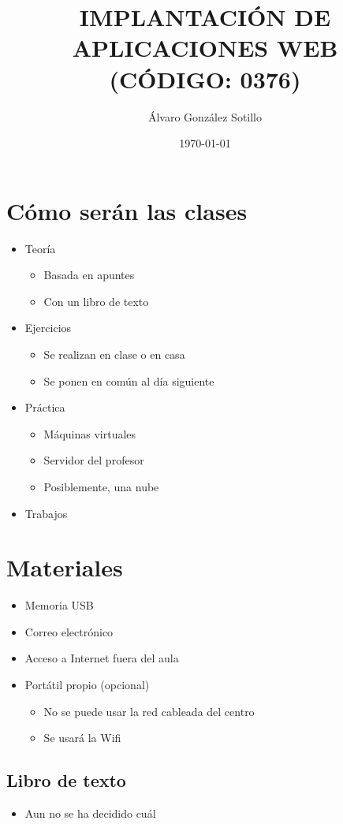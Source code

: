 \documentclass[a4paper]{article}
\author{Álvaro González Sotillo}
\date{\today}
\title{IMPLANTACIÓN DE APLICACIONES WEB\\\medskip
\large  (CÓDIGO: 0376)}
\begin{document}
\maketitle
\setcounter{tocdepth}{1}
\tableofcontents

\captionsetup{font=scriptsize}

\section{Cómo serán las clases}
\label{sec:org0000000}
\begin{itemize}
\item Teoría
\begin{itemize}
\item Basada en apuntes
\item Con un libro de texto
\end{itemize}
\item Ejercicios
\begin{itemize}
\item Se realizan en clase o en casa
\item Se ponen en común al día siguiente
\end{itemize}
\item Práctica
\begin{itemize}
\item Máquinas virtuales
\item Servidor del profesor
\item Posiblemente, una nube
\end{itemize}
\item Trabajos
\end{itemize}

\section{Materiales}
\label{sec:org0000006}
\begin{itemize}
\item Memoria USB
\item Correo electrónico
\item Acceso a Internet fuera del aula
\item Portátil propio (opcional)
\begin{itemize}
\item No se puede usar la red cableada del centro
\item Se usará la Wifi
\end{itemize}
\end{itemize}
\subsection{Libro de texto}
\label{sec:org0000003}
\begin{itemize}
\item Aun no se ha decidido cuál
\end{itemize}
\end{document}
